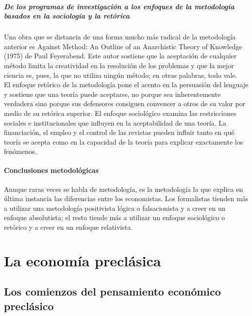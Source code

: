 \documentclass[10pt]{book}
\begin{document}
\subsubsection{De los programas de investigación a los enfoques de la metodología basados en la sociología y la retórica}
Una obra que se distancia de una forma mucho más radical de la metodología anterior es Against Method: An Outline of an Anarchistic Theory of Knowledge (1975) de Paul Feyerabend. Este autor sostiene que la aceptación de cualquier método limita la creatividad en la resolución de los problemas y que la mejor ciencia es, pues, la que no utiliza ningún método; en otras palabras, todo vale.\\

El enfoque retórico de la metodología pone el acento en la persuasión del lenguaje y sostiene que una teoría puede aceptarse, no porque sea inherentemente verdadera sino porque sus defensores consiguen convencer a otros de su valor por medio de su retórica superior. El enfoque sociológico examina las restricciones sociales e institucionales que influyen en la aceptabilidad de una teoría. La financiación, el empleo y el control de las revistas pueden influir tanto en qué teoría se acepta como en la capacidad de la teoría para explicar exactamente los fenómenos.

\subsection{Conclusiones metodológicas}
Aunque raras veces se habla de metodología, es la metodología la que explica en última instancia las diferencias entre los economistas. Los formalistas tienden más a utilizar una metodología positivista lógica o falsacionista y a creer en un enfoque absolutista; el resto tiende más a utilizar un enfoque sociológico o retórico y a creer en un enfoque relativista.


\part{La economía preclásica}

\chapter{Los comienzos del pensamiento económico preclásico}
\end{document}
